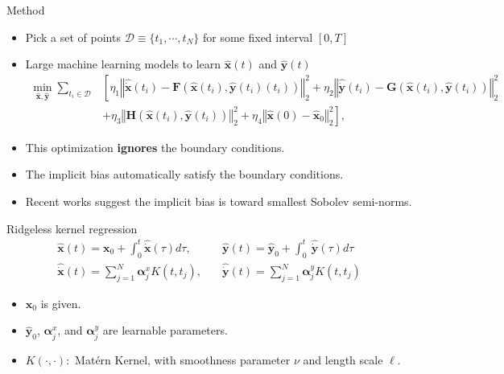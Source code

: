 \documentclass[aspectratio=169,10pt]{beamer}
\newcommand{\emphcolor}[1]{\textbf{\textcolor{emphcolorval}{#1}}}
\begin{document}
\begin{frame}{Method}
	\begin{itemize}
		\item Pick a set of points $\mathcal{D}\equiv \{t_1,\cdots,t_N\}$ for some fixed interval $[0,T]$
		\vspace{0.1in}
		\item Large machine learning models to learn $\hat{\mathbf{x}}(t)$ and $\hat{\mathbf{y}}(t)$
	\begin{align*}
		\min_{\hat{\mathbf{x}}, \hat{\mathbf{y}}} \sum_{t_i \in \mathcal{D}} &\left[\eta_1 \left\Vert \hat{\dot{\mathbf{x}}}(t_i) 
		- \mathbf{F}(\hat{\mathbf{x}}(t_i), \hat{\mathbf{y}}(t_i)(t_i)) \right\Vert_2^2 + \eta_2 \left\Vert \hat{\dot{\mathbf{y}}}(t_i) -  \mathbf{G}(\hat{\mathbf{x}}(t_i), \hat{\mathbf{y}}(t_i)) \right\Vert_2^2\right.\nonumber\\
		&\left.+ \eta_3 \left\Vert \mathbf{H}(\hat{\mathbf{x}}(t_i), \hat{\mathbf{y}}(t_i)) \right\Vert_2^2 + \eta_4 \left\Vert \hat{\mathbf{x}}(0) - \hat{\mathbf{x}}_0 \right\Vert_2^2\right],
	\end{align*}
	\item This optimization \emphcolor{ignores} the boundary conditions.
	 \vspace{0.1in}
	\item The implicit bias automatically satisfy the boundary conditions.
	\vspace{0.1in}
	\item Recent works suggest the implicit bias is toward smallest Sobolev semi-norms.
		\end{itemize}
\end{frame}

\begin{frame}{Ridgeless kernel regression}
\begin{align*}
	\hat{\mathbf{x}}(t) = \mathbf{x}_0+ \int_0^t \hat{\dot{\mathbf{x}}}(\tau) d\tau, &\quad \hat{\mathbf{y}}(t) = \hat{\mathbf{y}}_0+ \int_0^t \ \hat{\dot{\mathbf{y}}}(\tau) d\tau\\
	\hat{\dot{\mathbf{x}}}(t) = \sum_{j=1}^{N} \boldsymbol{\alpha}^x_j K(t,t_j), &\quad \hat{\dot{\mathbf{y}}}(t) = \sum_{j=1}^{N} \boldsymbol{\alpha}^y_j K(t,t_j)
\end{align*}
\begin{itemize}
	\item  $\mathbf{x}_0$ is given.
	\vspace{0.1in}
	\item $\hat{\mathbf{y}}_0$, $\boldsymbol{\alpha}^x_j$, and $\boldsymbol{\alpha}^y_j$ are learnable parameters. 
	\vspace{0.1in}
	\item $K(\cdot,\cdot):$ Matérn Kernel, with smoothness parameter $\nu$ and length scale $\ell$.
\end{itemize}
\end{frame}
\end{document}
